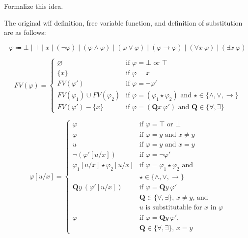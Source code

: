 \documentclass[12pt,leqno]{article}
\begin{document}
Formalize this idea.

\medskip
The original wff definition, free variable function, and definition of
substitution are as follows:

\[
  \varphi \Coloneqq \bot \mid \top \mid x \mid (\lnot \varphi) \mid
    (\varphi \land \varphi) \mid (\varphi \lor \varphi) \mid
    (\varphi \to \varphi) \mid (\forall x\ \varphi) \mid (\exists x\ \varphi)
\]

\[
  FV(\varphi) = \left\{
    \begin{array}{ll}
    \varnothing  & \text{if $\varphi = \bot$ or $\top$} \\
    \{x\}        & \text{if $\varphi = x$} \\
    FV(\varphi') & \text{if $\varphi = \lnot\varphi'$} \\
    FV(\varphi_1) \cup FV(\varphi_2) &
      \text{if $\varphi = (\varphi_1 \star \varphi_2)$ and
        $\star \in \{\land, \lor, \to\}$} \\
    FV(\varphi') - \{x\} &
      \text{if $\varphi = (\mathbf{Q}x\ \varphi')$ and
        $\mathbf{Q} \in \{\forall, \exists\}$}
    \end{array}
  \right.
\]

\[
  \varphi[u/x] = \left\{
    \begin{array}{ll}
    \varphi              & \text{if $\varphi = \top$ or $\bot$} \\
    \varphi              & \text{if $\varphi = y$ and $x \ne y$} \\
    u                    & \text{if $\varphi = y$ and $x = y$} \\
    \lnot(\varphi'[u/x]) & \text{if $\varphi = \lnot \varphi'$} \\
    \varphi_1[u/x] \star \varphi_2[u/x] &
      \text{if $\varphi = \varphi_1 \star \varphi_2$ and} \\
      & \text{$\star \in \{\land, \lor, \to\}$} \\
    \mathbf{Q}y\ (\varphi'[u/x])
      & \text{if $\varphi = \mathbf{Q}y\ \varphi'$} \\
      & \text{$\mathbf{Q} \in \{\forall, \exists\}$, $x \ne y$, and} \\
      & \text{$u$ is substitutable for $x$ in $\varphi$} \\
    \varphi & \text{if $\varphi = \mathbf{Q}y\ \varphi'$,} \\
      & \text{$\mathbf{Q} \in \{\forall, \exists\}$, $x = y$}
    \end{array}
  \right.
\]
\end{document}
